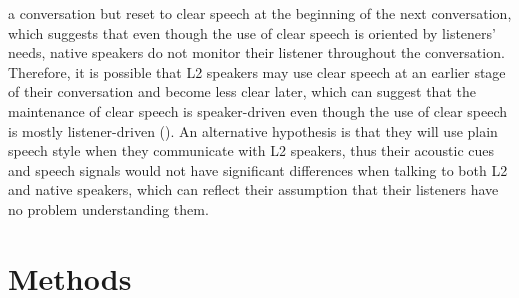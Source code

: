 \documentclass[
  man,
  floatsintext,
  longtable,
  nolmodern,
  notxfonts,
  notimes,
  colorlinks=true,linkcolor=blue,citecolor=blue,urlcolor=blue]{apa7}
\begin{document}
a conversation but reset to clear speech at the beginning of the next
conversation, which suggests that even though the use of clear speech is
oriented by listeners' needs, native speakers do not monitor their
listener throughout the conversation. Therefore, it is possible that L2
speakers may use clear speech at an earlier stage of their conversation
and become less clear later, which can suggest that the maintenance of
clear speech is speaker-driven even though the use of clear speech is
mostly listener-driven (). An alternative hypothesis is that they will use
plain speech style when they communicate with L2 speakers, thus their
acoustic cues and speech signals would not have significant differences
when talking to both L2 and native speakers, which can reflect their
assumption that their listeners have no problem understanding them.

\section{Methods}\label{methods}
\end{document}
